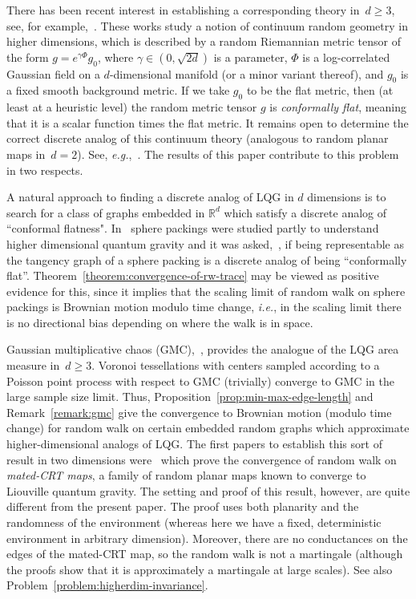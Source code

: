 \documentclass[12pt]{amsart}
\numberwithin{equation}{section}
\newcommand{\eg}{{\it e.g.}}
\newcommand{\ie}{{\it i.e.}}
\begin{document}
There has been recent interest in establishing a corresponding theory in~$d \geq 3$, see, for example,~\cite{schiavo2021conformally, cercle2022, ding2023tightness}. These works study a notion of continuum random geometry in higher dimensions, which is described by a random Riemannian metric tensor of the form $g = e^{\gamma \Phi} g_0$, where $\gamma \in (0,\sqrt{2d})$ is a parameter, $\Phi$ is a log-correlated Gaussian field on a $d$-dimensional manifold (or a minor variant thereof), and $g_0$ is a fixed smooth background metric. If we take $g_0$ to be the flat metric, then (at least at a heuristic level) the random metric tensor $g$ is \emph{conformally flat}, meaning that it is a scalar function times the flat metric. It remains open to determine the correct discrete analog of this continuum theory (analogous to random planar maps in~$d=2$). See, \eg,~\cite[Section 1.2]{ding2023tightness}. The results of this paper contribute to this problem in two respects.


A natural approach to finding a discrete analog of LQG in $d$ dimensions is to search for a class of graphs embedded in $\mathbb R^d$ which satisfy a discrete analog of ``conformal flatness". In~\cite{curienbenjamini} sphere packings were studied partly to understand higher dimensional quantum gravity and it was asked,~\cite[Question 2]{curienbenjamini}, if being representable as the tangency graph of a sphere packing is a discrete analog of being ``conformally flat''. Theorem~\ref{theorem:convergence-of-rw-trace} may be viewed as positive evidence for this, since it implies that the scaling limit of random walk on sphere packings is Brownian motion modulo time change, \ie, in the scaling limit there is no directional bias depending on where the walk is in space.

 Gaussian multiplicative chaos (GMC),~\cite{kahane1985chaos,rhodes2014gaussian,berestycki2024gaussian}, provides the analogue of the LQG area measure in~$d \geq 3$. Voronoi tessellations with centers sampled according to a Poisson point process with respect to GMC (trivially) converge to GMC in the large sample size limit. Thus, Proposition~\ref{prop:min-max-edge-length} and Remark~\ref{remark:gmc} give the convergence to Brownian motion (modulo time change) for random walk on certain embedded random graphs which approximate higher-dimensional analogs of LQG. The first papers to establish this sort of result in two dimensions were~\cite{ GMS-Tutte, GMSInvariance} which prove the convergence of random walk on \emph{mated-CRT maps}, a family of random planar maps known to converge to Liouville quantum gravity. The setting and proof of this result, however, are quite different from the present paper. The proof uses both planarity and the randomness of the environment (whereas here we have a fixed, deterministic environment in arbitrary dimension). Moreover, there are no conductances on the edges of the mated-CRT map, so the random walk is not a martingale (although the proofs show that it is approximately a martingale at large scales). See also Problem~\ref{problem:higherdim-invariance}.
\end{document}
